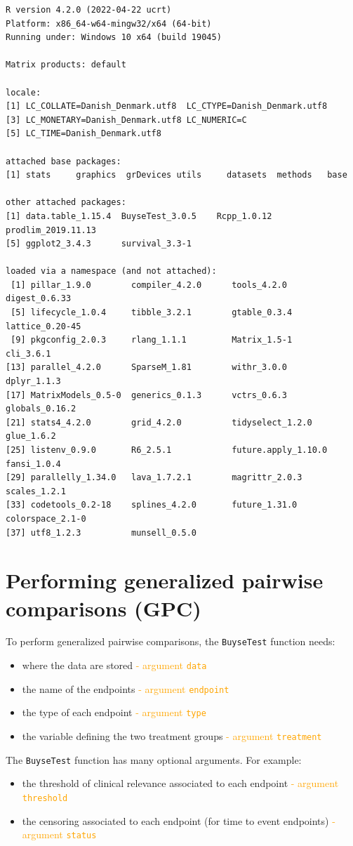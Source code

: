 \documentclass[12pt]{article}
\begin{document}
\begin{verbatim}
R version 4.2.0 (2022-04-22 ucrt)
Platform: x86_64-w64-mingw32/x64 (64-bit)
Running under: Windows 10 x64 (build 19045)

Matrix products: default

locale:
[1] LC_COLLATE=Danish_Denmark.utf8  LC_CTYPE=Danish_Denmark.utf8   
[3] LC_MONETARY=Danish_Denmark.utf8 LC_NUMERIC=C                   
[5] LC_TIME=Danish_Denmark.utf8    

attached base packages:
[1] stats     graphics  grDevices utils     datasets  methods   base     

other attached packages:
[1] data.table_1.15.4  BuyseTest_3.0.5    Rcpp_1.0.12        prodlim_2019.11.13
[5] ggplot2_3.4.3      survival_3.3-1    

loaded via a namespace (and not attached):
 [1] pillar_1.9.0        compiler_4.2.0      tools_4.2.0         digest_0.6.33      
 [5] lifecycle_1.0.4     tibble_3.2.1        gtable_0.3.4        lattice_0.20-45    
 [9] pkgconfig_2.0.3     rlang_1.1.1         Matrix_1.5-1        cli_3.6.1          
[13] parallel_4.2.0      SparseM_1.81        withr_3.0.0         dplyr_1.1.3        
[17] MatrixModels_0.5-0  generics_0.1.3      vctrs_0.6.3         globals_0.16.2     
[21] stats4_4.2.0        grid_4.2.0          tidyselect_1.2.0    glue_1.6.2         
[25] listenv_0.9.0       R6_2.5.1            future.apply_1.10.0 fansi_1.0.4        
[29] parallelly_1.34.0   lava_1.7.2.1        magrittr_2.0.3      scales_1.2.1       
[33] codetools_0.2-18    splines_4.2.0       future_1.31.0       colorspace_2.1-0   
[37] utf8_1.2.3          munsell_0.5.0
\end{verbatim}

\clearpage

\section{Performing generalized pairwise comparisons (GPC)}
\label{sec:org6eab4ab}

To perform generalized pairwise comparisons, the \texttt{BuyseTest} function needs:
\begin{itemize}
\item where the data are stored \hfill \textcolor{orange}{- argument \texttt{data}}
\item the name of the endpoints \hfill \textcolor{orange}{- argument \texttt{endpoint}}
\item the type of each endpoint \hfill \textcolor{orange}{- argument \texttt{type}}
\item the variable defining the two treatment groups \hfill
\textcolor{orange}{- argument \texttt{treatment}}
\end{itemize}
The \texttt{BuyseTest} function has many optional arguments. For example:
\begin{itemize}
\item the threshold of clinical relevance associated to each endpoint \hfill \textcolor{orange}{- argument \texttt{threshold}}
\item the censoring associated to each endpoint (for time to event endpoints) \hfill \textcolor{orange}{- argument \texttt{status}}
\end{itemize}
\end{document}
